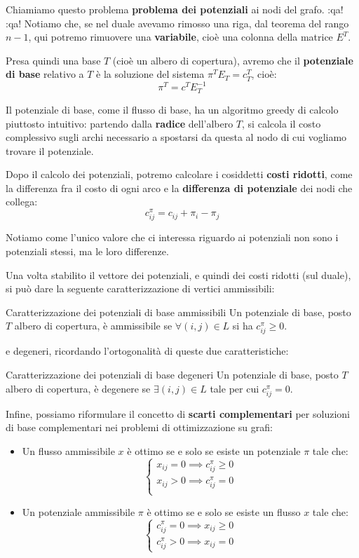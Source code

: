 \documentclass[a4paper,11pt]{article}
\begin{document}
Chiamiamo questo problema \textbf{problema dei potenziali} ai nodi del grafo.
:qa!
:qa!
Notiamo che, se nel duale avevamo rimosso una riga, dal teorema del rango $n-1$, qui potremo rimuovere una \textbf{variabile}, cioè una colonna della matrice $E^T$.

Presa quindi una base $T$ (cioè un albero di copertura), avremo che il \textbf{potenziale di base} relativo a $T$ è la soluzione del sistema $ \pi^T E_T =c_T^T $, cioè:
$$
\pi^T = c^T E_T^{-1}
$$

Il potenziale di base, come il flusso di base, ha un algoritmo greedy di calcolo piuttosto intuitivo: partendo dalla \textbf{radice} dell'albero $T$, si calcola il costo complessivo sugli archi necessario a spostarsi da questa al nodo di cui vogliamo trovare il potenziale.

Dopo il calcolo dei potenziali, potremo calcolare i cosiddetti \textbf{costi ridotti}, come la differenza fra il costo di ogni arco e la \textbf{differenza di potenziale} dei nodi che collega:
$$
c^\pi_{ij} = c_{ij} + \pi_i - \pi_j
$$

Notiamo come l'unico valore che ci interessa riguardo ai potenziali non sono i potenziali stessi, ma le loro differenze. 

Una volta stabilito il vettore dei potenziali, e quindi dei costi ridotti (sul duale), si può dare la seguente caratterizzazione di vertici ammissibili:

\begin{definition}{Caratterizzazione dei potenziali di base ammissibili}
	Un potenziale di base, posto $T$ albero di copertura, è ammissibile se $\forall (i, j) \in L$ si ha $c^\pi_{ij} \geq 0$. 
\end{definition}

e degeneri, ricordando l'ortogonalità di queste due caratteristiche:

\begin{definition}{Caratterizzazione dei potenziali di base degeneri}
	Un potenziale di base, posto $T$ albero di copertura, è degenere se $\exists (i, j) \in L$ tale per cui $c^\pi_{ij} = 0$.
\end{definition}

Infine, possiamo riformulare il concetto di \textbf{scarti complementari} per soluzioni di base complementari nei problemi di ottimizzazione su grafi:
\begin{itemize}
	\item Un flusso ammissibile $x$ è ottimo se e solo se esiste un potenziale $\pi$ tale che:
		\[
			\begin{cases}
				x_{ij} = 0 \implies c^\pi_{ij} \geq 0 \\ 	
				x_{ij} > 0 \implies c^\pi_{ij} = 0 \\ 	
			\end{cases}
		\]
	\item Un potenziale ammissibile $\pi$ è ottimo se e solo se esiste un flusso $x$ tale che:
		\[
			\begin{cases}
				c^\pi_{ij} = 0 \implies x_{ij} \geq 0 \\ 
				c^\pi_{ij} > 0 \implies x_{ij} = 0
			\end{cases}
		\]
\end{itemize}
\end{document}
